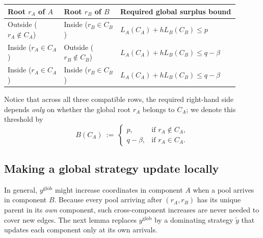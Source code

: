\documentclass[11pt,letterpaper]{article}
\begin{document}
\begin{center}
\small\renewcommand{\arraystretch}{1.25}
\begin{tabular}{@{}p{0.22\linewidth}p{0.22\linewidth}p{0.46\linewidth}@{}}
\hline
\textbf{Root $r_A$ of $A$} & \textbf{Root $r_B$ of $B$} & \textbf{Required global surplus bound} \\
\hline
Outside ($r_A\notin C_A$) & Inside ($r_B\in C_B$) & $L_A(C_A)+hL_B(C_B)\le p$ \\
Inside ($r_A\in C_A$) & Outside ($r_B\notin C_B$) & $L_A(C_A)+hL_B(C_B)\le q-\beta$ \\
Inside ($r_A\in C_A$) & Inside ($r_B\in C_B$) & $L_A(C_A)+hL_B(C_B)\le q-\beta$ \\
\hline
\end{tabular}
\end{center}

Notice that across all three compatible rows, the required right-hand side depends \emph{only} on whether the global root $r_A$ belongs to $C_A$; we denote this threshold by
\[
  B(C_A)\ :=\ \begin{cases}
    p, & \text{if } r_A\notin C_A,\\
    q-\beta, & \text{if } r_A\in C_A.
  \end{cases}
\]

\subsection{Making a global strategy update locally}

In general, $y^{\text{glob}}$ might increase coordinates in component $A$ when a pool arrives in component $B$. Because every pool arriving after $(r_A,r_B)$ has its unique parent in its \emph{own} component, such cross-component increases are never needed to cover new edges. The next lemma replaces $y^{\text{glob}}$ by a dominating strategy $\tilde y$ that updates each component only at its own arrivals.
\end{document}
